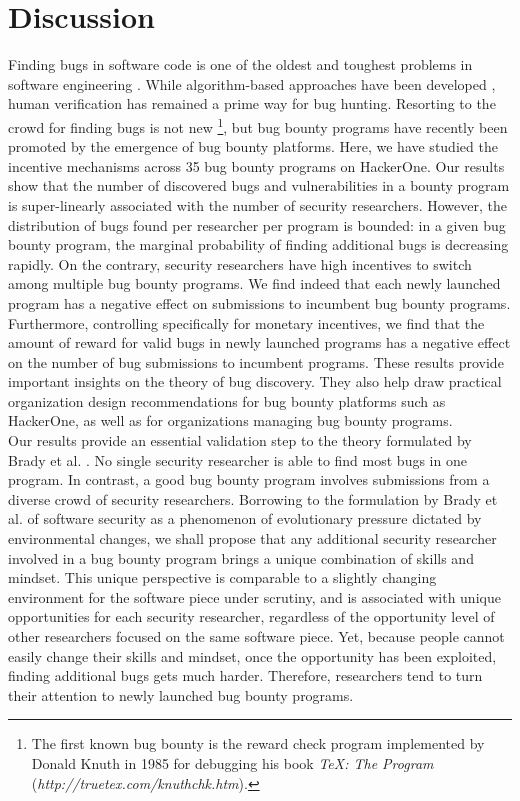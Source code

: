 \section{Discussion}
\label{sec:discussion}
Finding bugs in software code is one of the oldest and toughest problems in software engineering \cite{adams1984textordfeminineoptimizing}. While algorithm-based approaches have been developed \cite{avgerinos2014enhancing}, human verification has remained a prime way for bug hunting. Resorting to the crowd for finding bugs is not new \footnote{The first known bug bounty is the reward check program implemented by Donald Knuth in 1985 for debugging his book {\it TeX: The Program} ({\it http://truetex.com/knuthchk.htm}).}, but bug bounty programs have recently been promoted by the emergence of bug bounty platforms. Here, we have studied the incentive mechanisms across 35 bug bounty programs on HackerOne. Our results show that the number of discovered bugs and vulnerabilities in a bounty program is super-linearly associated with the number of security researchers. However, the distribution of bugs found per researcher per program is bounded: in a given bug bounty program, the marginal probability of finding additional bugs is decreasing rapidly. On the contrary, security researchers have high incentives to switch among multiple bug bounty programs. We find indeed that each newly launched program has a negative effect on submissions to incumbent bug bounty programs. Furthermore, controlling specifically for monetary incentives, we find that the amount of reward for valid bugs in newly launched programs has a negative effect on the number of bug submissions to incumbent programs. These results provide important insights on the theory of bug discovery. They also help draw practical organization design recommendations for bug bounty platforms such as HackerOne, as well as for organizations managing bug bounty programs.\\
 
Our results provide an essential validation step to the theory formulated by Brady et al. \cite{brady1999murphy}. No single security researcher is able to find most bugs in one program. In contrast, a good bug bounty program involves submissions from a diverse crowd of security researchers. Borrowing to the formulation by Brady et al. of software security as a phenomenon of evolutionary pressure dictated by environmental changes, we shall propose that any additional security researcher involved in a bug bounty program brings a unique combination of skills and mindset. This unique perspective is comparable to a slightly changing environment for the software piece under scrutiny, and is associated with unique opportunities for each security researcher, regardless of the opportunity level of other researchers focused on the same software piece. Yet, because people cannot easily change their skills and mindset, once the opportunity has been exploited, finding additional bugs gets much harder. Therefore, researchers tend to turn their attention to newly launched bug bounty programs.\\

